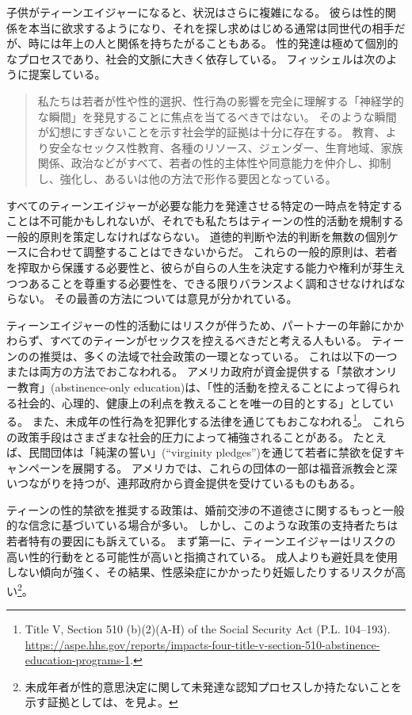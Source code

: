\documentclass[paper=a4,book,openany]{jlreq} \usepackage{mystyle}
\begin{document}
子供がティーンエイジャーになると、状況はさらに複雑になる。
彼らは性的関係を本当に欲求するようになり、それを探し求めはじめる{\DDASH}通常は同世代の相手だが、時には年上の人と関係を持ちたがることもある。
性的発達は極めて個別的なプロセスであり、社会的文脈に大きく依存している。
フィッシェルは次のように提案している。

\begin{quote}
私たちは若者が性や性的選択、性行為の影響を完全に理解する「神経学的な瞬間」を発見することに焦点を当てるべきではない。
そのような瞬間が幻想にすぎないことを示す社会学的証拠は十分に存在する。
教育、より安全なセックス性教育、各種のリソース、ジェンダー、生育地域、家族関係、政治などがすべて、若者の性的主体性や同意能力を仲介し、抑制し、強化し、あるいは他の方法で形作る要因となっている。
\citep[p.305]{fischel10:_per_se_power}
\end{quote}

すべてのティーンエイジャーが必要な能力を発達させる特定の一時点を特定することは不可能かもしれないが、それでも私たちはティーンの性的活動を規制する一般的原則を策定しなければならない。
道徳的判断や法的判断を無数の個別ケースに合わせて調整することはできないからだ。
これらの一般的原則は、若者を搾取から保護する必要性と、彼らが自らの人生を決定する能力や権利が芽生えつつあることを尊重する必要性を、できる限りバランスよく調和させなければならない。
その最善の方法については意見が分かれている。

ティーンエイジャーの性的活動にはリスクが伴うため、パートナーの年齢にかかわらず、すべてのティーンがセックスを控えるべきだと考える人もいる。
ティーンのの推奨は、多くの法域で社会政策の一環となっている。
これは以下の一つまたは両方の方法でおこなわれる。
アメリカ政府が資金提供する「禁欲オンリー教育」(abstinence-only education)は、「性的活動を控えることによって得られる社会的、心理的、健康上の利点を教えることを唯一の目的とする」としている。
また、未成年の性行為を犯罪化する法律を通じてもおこなわれる\footnote{Title V, Section 510 (b)(2)(A-H) of the Social Security Act (P.L. 104--193). \url{https://aspe.hhs.gov/reports/impacts-four-title-v-section-510-abstinence-education-programs-1}.}。
これらの政策手段はさまざまな社会的圧力によって補強されることがある。
たとえば、民間団体は「純潔の誓い」(``virginity pledges'')を通じて若者に禁欲を促すキャンペーンを展開する。
アメリカでは、これらの団体の一部は福音派教会と深いつながりを持つが、連邦政府から資金提供を受けているものもある。

ティーンの性的禁欲を推奨する政策は、婚前交渉の不道徳さに関するもっと一般的な信念に基づいている場合が多い。
しかし、このような政策の支持者たちは若者特有の要因にも訴えている。
まず第一に、ティーンエイジャーはリスクの高い性的行動をとる可能性が高いと指摘されている。
成人よりも避妊具を使用しない傾向が強く、その結果、性感染症にかかったり妊娠したりするリスクが高い\footnote{未成年者が性的意思決定に関して未発達な認知プロセスしか持たないことを示す証拠としては、\citet{drobac14:_neurob_decis_makin_high_risk}を見よ。
}。
\end{document}
